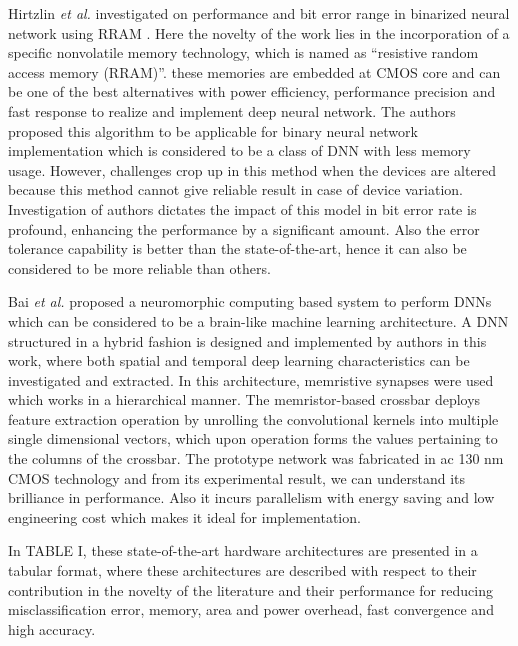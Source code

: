 \documentclass[journal]{IEEEtran}
\begin{document}
\par Hirtzlin \textit{et al.} investigated on performance and bit error range in binarized neural network using RRAM \cite{paper12}. Here the novelty of the work lies in the incorporation of a specific nonvolatile memory technology, which is named as ``resistive random access memory (RRAM)''. these memories are embedded at CMOS core and can be one of the best alternatives with power efficiency, performance precision and fast response to realize and implement deep neural network. The authors proposed this algorithm to be applicable for binary neural  network implementation which is considered to be a class of DNN with less memory usage. However, challenges crop up in this method when the devices are altered because this method cannot give reliable result in case of device variation. Investigation of authors dictates the impact of this model in bit error rate is profound, enhancing the performance by a significant amount. Also the error tolerance capability is better than the state-of-the-art, hence it can also be considered to be more reliable than others.

\par Bai \textit{et al.} proposed a neuromorphic computing based system to perform DNNs which can be considered to be a brain-like machine learning architecture. A DNN structured in a hybrid fashion is designed and implemented by authors in this work, where both spatial and temporal deep learning characteristics can be investigated and extracted. In this architecture, memristive synapses were used which works in a hierarchical manner. The memristor-based crossbar deploys feature extraction operation by unrolling the convolutional kernels into multiple single dimensional vectors, which upon operation forms the values pertaining to the columns of the crossbar. The prototype network was fabricated in ac 130 nm CMOS technology and from its experimental result, we can understand its brilliance in performance. Also it incurs parallelism with energy saving and low engineering cost which makes it ideal for implementation.

\par In TABLE I, these state-of-the-art hardware architectures are presented in a tabular format, where these architectures are described with respect to their contribution in the novelty of the literature and their performance for reducing misclassification error, memory, area and power overhead, fast convergence and high accuracy. 
\end{document}
